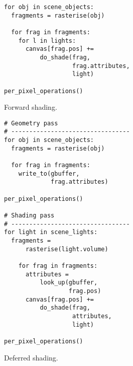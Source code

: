 \begin{listing}[b]
  \begin{verbatim}
for obj in scene_objects:
  fragments = rasterise(obj)

  for frag in fragments:
    for l in lights:
      canvas[frag.pos] +=
          do_shade(frag,
                   frag.attributes,
                   light)

per_pixel_operations()
  \end{verbatim}
  \caption{Forward shading.}
  \label{lst:fds-algorithm:forward}
\end{listing} %
%
\begin{listing}[b]
  \begin{verbatim}
# Geometry pass
# ---------------------------------
for obj in scene_objects:
  fragments = rasterise(obj)
    
  for frag in fragments:
    write_to(gbuffer,
             frag.attributes)
        
per_pixel_operations()

# Shading pass
# ---------------------------------
for light in scene_lights:
  fragments =
      rasterise(light.volume)
    
    for frag in fragments:
      attributes =
          look_up(gbuffer,
                  frag.pos)
      canvas[frag.pos] +=
          do_shade(frag,
                   attributes,
                   light)

per_pixel_operations()

  \end{verbatim}
  \caption{Deferred shading.}
  \label{lst:fds-algorithm:deferred}
\end{listing}

